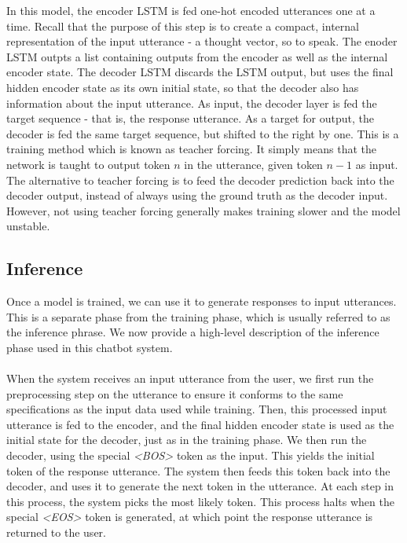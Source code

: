 \documentclass{article}
\begin{document}
In this model, the encoder LSTM is fed one-hot encoded utterances one at a
time. Recall that the purpose of this step is to create a compact, internal
representation of the input utterance - a thought vector, so to speak. The
enoder LSTM outpts a list containing outputs from the encoder as well as the
internal encoder state. The decoder LSTM discards the LSTM output, but uses
the final hidden encoder state as its own initial state, so that the decoder
also has information about the input utterance. As input, the decoder layer
is fed the target sequence - that is, the response utterance. As a target for
output, the decoder is fed the same target sequence, but shifted to the right
by one. This is a training method which is known as teacher forcing. It simply
means that the network is taught to output token $n$ in the utterance, given
token $n-1$ as input. The alternative to teacher forcing is to feed the decoder
prediction back into the decoder output, instead of always using the ground
truth as the decoder input. However, not using teacher forcing generally makes
training slower and the model unstable.

\subsection*{Inference}

Once a model is trained, we can use it to generate responses to input
utterances. This is a separate phase from the training phase, which is usually
referred to as the inference phrase. We now provide a high-level description
of the inference phase used in this chatbot system.

\paragraph{}
When the system receives an input utterance from the user, we first run the
preprocessing step on the utterance to ensure it conforms to the same
specifications as the input data used while training. Then, this processed
input utterance is fed to the encoder, and the final hidden encoder state is
used as the initial state for the decoder, just as in the training phase. We
then run the decoder, using the special \emph{<BOS>} token as the input. This
yields the initial token of the response utterance. The system then feeds this
token back into the decoder, and uses it to generate the next token in the
utterance. At each step in this process, the system picks the most likely
token. This process halts when the special \emph{<EOS>} token is generated,
at which point the response utterance is returned to the user.
\end{document}
